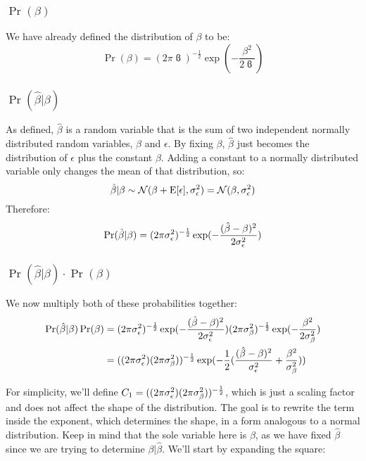 \documentclass[12pt]{article}
\begin{document}
\subsubsection{\texorpdfstring{$\Pr(\beta)$}{Pr(beta)}}
We have already defined the distribution of $\beta$ to be:
$$ \Pr(\beta) = (2 \pi \varbeta)^{-\frac{1}{2}} \exp(- \frac{\beta^2}{2 \varbeta}) $$

\subsubsection{\texorpdfstring{$\Pr(\hat{\beta} | \beta)$}{Pr(beta-hat | beta)}}
As defined, $\hat{\beta}$ is a random variable that is the sum of two independent normally distributed random variables, $\beta$ and $\epsilon$.
By fixing $\beta$, $\hat{\beta}$ just becomes the distribution of $\epsilon$ plus the constant $\beta$.
Adding a constant to a normally distributed variable only changes the mean of that distribution, so:
$$ \hat{\beta} | \beta \sim \mathcal{N}(\beta + \mathrm{E}[\epsilon], \sigma_{\epsilon}^2) = \mathcal{N}(\beta, \sigma_{\epsilon}^2)$$
Therefore:
$$\Pr(\hat{\beta} | \beta) = (2 \pi \sigma_{\epsilon}^2)^{-\frac{1}{2}} \exp(- \frac{(\hat{\beta} - \beta)^2}{2 \sigma_{\epsilon}^2}) $$

\subsubsection{\texorpdfstring{$\Pr(\hat{\beta} | \beta) \cdot \Pr(\beta)$}{Pr(beta-hat | beta) Pr(beta)}}

We now multiply both of these probabilities together:
\begin{align*}
\Pr(\hat{\beta} | \beta) \Pr(\beta) &= (2 \pi \sigma_{\epsilon}^2)^{-\frac{1}{2}} \exp(- \frac{(\hat{\beta} - \beta)^2}{2 \sigma_{\epsilon}^2}) (2 \pi \sigma_{\beta}^2)^{-\frac{1}{2}} \exp(- \frac{\beta^2}{2 \sigma_{\beta}^2}) \\
&= ((2 \pi \sigma_{\epsilon}^2)(2 \pi \sigma_{\beta}^2))^{-\frac{1}{2}} \exp(
    -\frac{1}{2} (\frac{(\hat{\beta} - \beta)^2}{\sigma_{\epsilon}^2} + \frac{\beta^2}{\sigma_{\beta}^2})
)
\end{align*}

For simplicity, we'll define $C_1 = ((2 \pi \sigma_{\epsilon}^2)(2 \pi \sigma_{\beta}^2))^{-\frac{1}{2}}$, which is just a scaling factor and does not affect the shape of the distribution.
The goal is to rewrite the term inside the exponent, which determines the shape, in a form analogous to a normal distribution.
Keep in mind that the sole variable here is $\beta$, as we have fixed $\hat{\beta}$ since we are trying to determine $\beta | \hat{\beta}$.
We'll start by expanding the square:
\end{document}
